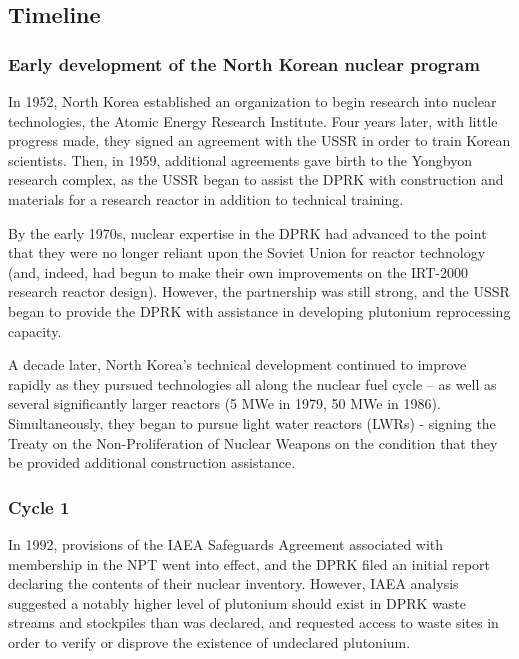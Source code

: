 \documentclass{article}
\begin{document}
\subsection{Timeline}
\subsubsection{Early development of the North Korean nuclear program}
In 1952, North Korea established an organization to begin research into nuclear technologies, the Atomic Energy Research Institute\cite{ntiAERI}. Four years later, with little progress made, they signed an agreement with the USSR in order to train Korean scientists\cite{nti15}. Then, in 1959, additional agreements gave birth to the Yongbyon research complex, as the USSR began to assist the DPRK with construction and materials for a research reactor in addition to technical training\cite{nti15}.

By the early 1970s, nuclear expertise in the DPRK had advanced to the point that they were no longer reliant upon the Soviet Union for reactor technology (and, indeed, had begun to make their own improvements on the IRT-2000 research reactor design)\cite{nti15}. However, the partnership was still strong, and the USSR began to provide the DPRK with assistance in developing plutonium reprocessing capacity\cite{nti15}.

A decade later, North Korea’s technical development continued to improve rapidly as they pursued technologies all along the nuclear fuel cycle – as well as several significantly larger reactors (5 MWe in 1979\cite{ntiYongbyon}, 50 MWe in 1986\cite{ntiYongbyon2}). Simultaneously, they began to pursue light water reactors (LWRs) - signing the Treaty on the Non-Proliferation of Nuclear Weapons on the condition that they be provided additional construction assistance\cite{nti15}.   

\subsubsection{Cycle 1}


In 1992, provisions of the IAEA Safeguards Agreement associated with membership in the NPT went into effect, and the DPRK filed an initial report declaring the contents of their nuclear inventory\cite{iaea92}. However, IAEA analysis suggested a notably higher level of plutonium should exist in DPRK waste streams and stockpiles than was declared, and requested access to waste sites in order to verify or disprove the existence of undeclared plutonium\cite{iaea09}. 
\end{document}
